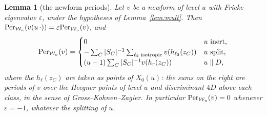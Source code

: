 \documentclass[11pt,a4paper]{article}
\newtheorem{lemma}[theorem]{Lemma}
\theoremstyle{remark}\newtheorem{remark}[theorem]{Remark}
\begin{document}
\begin{lemma}[the newform periods]\label{lem:newperiod}
Let $v$ be a newform of level $u$ with Fricke eigenvalue $\varepsilon$, under the hypotheses of Lemma~\ref{lem:mult}. Then
$\mathrm{Per}_{\mathcal W_u}(v(u\,\cdot))=\varepsilon\mathrm{Per}_{\mathcal W_u}(v)$, and
\[
\mathrm{Per}_{\mathcal W_u}(v)=\begin{cases}0&\text{$u$ inert,}\\ -\sum_C|S_C|^{-1}\sum_{\ell_2\text{ isotropic}}v(h_{\ell_2}(z_C))&\text{$u$ split,}\\
(u-1)\sum_C|S_C|^{-1}v(h_r(z_C))&\text{$u\parallel D$,}\end{cases}
\]
where the $h_\ell(z_C)$ are taken as points of $X_0(u)$: the sums on the right are periods of $v$ over the Heegner points of
level $u$ and discriminant $4D$ above each class, in the sense of Gross--Kohnen--Zagier. In particular
$\mathrm{Per}_{\mathcal W_u}(v)=0$ whenever $\varepsilon=-1$, whatever the splitting of $u$.
\end{lemma}
\end{document}

